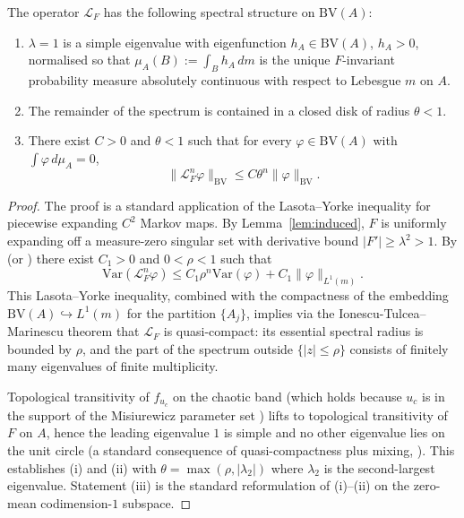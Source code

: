 \begin{lemma}
\label{lem:spectral-gap}
The operator $\mathcal{L}_F$ has the following spectral structure on
$\mathrm{BV}(A)$:
\begin{enumerate}
\item[(i)] $\lambda = 1$ is a simple eigenvalue with eigenfunction
      $h_A \in \mathrm{BV}(A)$, $h_A > 0$, normalised so that
      $\mu_A(B) := \int_B h_A \, dm$ is the unique $F$-invariant probability
      measure absolutely continuous with respect to Lebesgue $m$ on $A$.
\item[(ii)] The remainder of the spectrum is contained in a closed disk of
      radius $\theta < 1$.
\item[(iii)] There exist $C > 0$ and $\theta < 1$ such that for every
      $\varphi \in \mathrm{BV}(A)$ with $\int \varphi \, d\mu_A = 0$,
      \[
          \| \mathcal{L}_F^n \varphi \|_{\mathrm{BV}} \leq C \theta^n \|\varphi\|_{\mathrm{BV}}.
      \]
\end{enumerate}
\end{lemma}

\begin{proof}
The proof is a standard application of the Lasota--Yorke inequality for
piecewise expanding $C^2$ Markov maps. By Lemma~\ref{lem:induced}, $F$
is uniformly expanding off a measure-zero singular set with derivative
bound $|F'| \geq \lambda^2 > 1$. By
\cite[Theorem~3.4]{baladi2000positive} (or
\cite[Theorem~5.2]{demelo1993one}) there exist $C_1 > 0$ and
$0 < \rho < 1$ such that
\[
    \mathrm{Var}(\mathcal{L}_F^n \varphi)
    \leq C_1 \rho^n \mathrm{Var}(\varphi) + C_1 \|\varphi\|_{L^1(m)}.
\]
This Lasota--Yorke inequality, combined with the compactness of the
embedding $\mathrm{BV}(A) \hookrightarrow L^1(m)$ for the partition
$\{A_j\}$, implies via the Ionescu-Tulcea--Marinescu theorem
\cite[Ch.~II]{baladi2000positive} that $\mathcal{L}_F$ is
quasi-compact: its essential spectral radius is bounded by $\rho$, and
the part of the spectrum outside $\{|z| \leq \rho\}$ consists of
finitely many eigenvalues of finite multiplicity.

Topological transitivity of $f_{u_c}$ on the chaotic band (which holds
because $u_c$ is in the support of the Misiurewicz parameter set
\cite{misiurewicz1981absolutely}) lifts to topological transitivity of
$F$ on $A$, hence the leading eigenvalue $1$ is simple and no other
eigenvalue lies on the unit circle (a standard consequence of
quasi-compactness plus mixing, \cite[Theorem~1.5]{young1992decay}).
This establishes (i) and (ii) with $\theta = \max(\rho, |\lambda_2|)$
where $\lambda_2$ is the second-largest eigenvalue. Statement (iii) is
the standard reformulation of (i)--(ii) on the zero-mean
codimension-$1$ subspace.
\end{proof}

